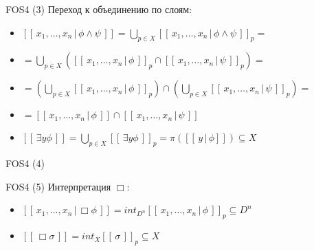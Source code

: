 \documentclass{beamer}
\begin{document}
\begin{frame}{FOS4 (3)}
Переход к объединению по слоям:\\
\bigskip
{\small
	\begin{itemize}
		\item $[ \! [ \, x_1, \ldots, x_n \, \vert \, \phi \wedge \psi \, ] \! ] = \bigcup_{p \in X} [ \! [ \, x_1, \ldots, x_n \, \vert \, \phi \wedge \psi \, ] \! ]_p =$\\ \medskip
		\item[] $= \bigcup_{p \in X}( [ \! [ \, x_1, \ldots, x_n \, \vert \, \phi \, ] \! ]_p \cap [ \! [ \, x_1, \ldots, x_n \, \vert \, \psi \, ] \! ]_p ) =$\\ \medskip
		\item[] $= \left(\bigcup_{p \in X}[ \! [ \, x_1, \ldots, x_n \, \vert \, \phi \, ] \! ]_p \right) \cap \left(\bigcup_{p \in X}[ \! [ \, x_1, \ldots, x_n \, \vert \, \psi \, ] \! ]_p \right) =$\\ \medskip
		\item[] $= [ \! [ \, x_1, \ldots, x_n \, \vert \, \phi \, ] \! ] \cap [ \! [ \, x_1, \ldots, x_n \, \vert \, \psi \, ] \! ]$\\ 
		\bigskip
		\item $[ \! [ \, \exists y \phi \, ] \! ] = \bigcup_{p \in X}[ \! [ \, \exists y \phi \, ] \! ]_p = \pi([ \! [ \, y \, \vert \, \phi ] \! ]) \subseteq X$
	\end{itemize}
}
\end{frame}

\begin{frame}{FOS4 (4)}
\begin{center}
	\begin{figure}[H]
	\end{figure}
\end{center}
\end{frame}

\begin{frame}{FOS4 (5)}
Интерпретация $\Box$:\\
\bigskip
{\small
	\begin{itemize}
		\item $[ \! [ \, x_1, \ldots, x_n \, \vert \, \Box \phi \, ] \! ] = int_{D^n} [ \! [ \, x_1, \ldots, x_n \, \vert \, \phi \, ] \! ]_p \subseteq D^n$\\ \medskip
		\item $[ \! [ \, \Box \sigma \, ] \! ] = int_{X} [ \! [ \, \sigma \, ] \! ]_p \subseteq X$
	\end{itemize}
}
\end{frame}
\end{document}
